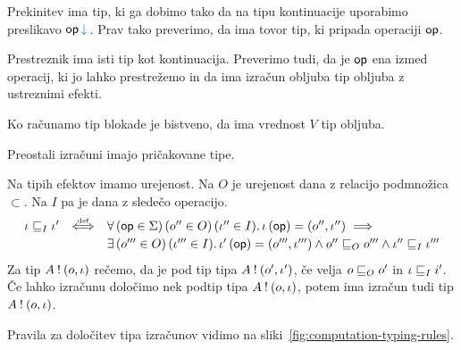 Prekinitev ima tip, ki ga dobimo tako da na tipu kontinuacije uporabimo preslikavo $\opincomp{op}$. Prav tako preverimo, da ima tovor tip, ki pripada operaciji $\mathsf{op}$. 

Prestreznik ima isti tip kot kontinuacija. Preverimo tudi, da je $\mathsf{op}$ ena izmed operacij, ki jo lahko prestrežemo in da ima izračun obljuba tip obljuba z ustreznimi efekti.

Ko računamo tip blokade je bistveno, da ima vrednost $V$ tip obljuba. 

Preostali izračuni imajo pričakovane tipe.

Na tipih efektov imamo urejenost. Na $O$ je urejenost dana z relacijo podmnožica $\subset$.
Na $I$ pa je dana z sledečo operacijo.
$$
\begin{array}{l c l}
	\iota \sqsubseteq_{I} \iota'
	&
	\mathrel{\overset{\text{\tiny def}}{\Longleftrightarrow}}
	&
	\forall\, (\mathsf{op} \in \Sigma) \, (o'' \in O) \, (\iota'' \in I) .\, \iota\, (\mathsf{op}) = ({o''} , {\iota''}) \implies 
	\\[0.5ex]
	&& \exists\, (o''' \in O) \, (\iota''' \in I) .\, \iota'\, (\mathsf{op}) = ({o'''} , {\iota'''}) \wedge o'' \sqsubseteq_{O} o''' \wedge \iota'' \sqsubseteq_{I} \iota'''
\end{array}
$$
Za tip $A \mathbin{!} (o, \iota)$ rečemo, da je pod tip tipa $A \mathbin{!} (o', \iota')$, če velja $o \sqsubseteq_{O} o'$ in $\iota \sqsubseteq_{I} i'$. Če lahko izračunu določimo nek podtip tipa $A \mathbin{!} (o, \iota)$, potem ima izračun tudi tip $A \mathbin{!} (o, \iota)$.

Pravila za določitev tipa izračunov vidimo na sliki~\ref{fig:computation-typing-rules}.

